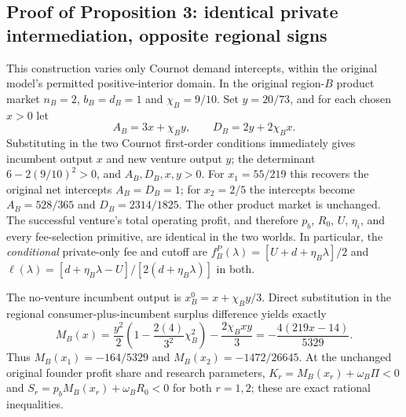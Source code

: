 \subsection{Proof of Proposition 3: identical private intermediation, opposite regional signs}
\label{app:incidence-twins}
This construction varies only Cournot demand intercepts, within the original
model's permitted positive-interior domain. In the original region-$B$
product market $n_B=2$, $b_B=d_B=1$ and $\chi_B=9/10$.
Set $y=20/73$, and for each chosen $x>0$ let
\[
 A_B=3x+\chi_B y,\qquad D_B=2y+2\chi_B x.
\]
Substituting in the two Cournot first-order conditions immediately gives
incumbent output $x$ and new venture output $y$; the determinant
$6-2(9/10)^2>0$, and $A_B,D_B,x,y>0$.
For $x_1=55/219$ this recovers the original net intercepts
$A_B=D_B=1$; for $x_2=2/5$ the intercepts become
$A_B=528/365$ and $D_B=2314/1825$.
The other product market is unchanged. The successful venture's
total operating profit, and therefore $p_b$, $R_0$, $U$, $\eta_i$,
and every fee-selection primitive, are identical in the two worlds.
In particular, the \emph{conditional} private-only fee and cutoff
are $f_B^P(\lambda)=[U+d+\eta_B\lambda]/2$ and
$\ell(\lambda)=[d+\eta_B\lambda-U]/[2(d+\eta_B\lambda)]$
in both.

The no-venture incumbent output is
$x_B^0=x+\chi_B y/3$. Direct substitution in the regional
consumer-plus-incumbent surplus difference yields exactly
\[
 M_B(x)
 =\frac{y^2}{2}
   \left(1-\frac{2(4)}{3^2}\chi_B^2\right)
     -\frac{2\chi_B xy}{3}
 =-\frac{4(219x-14)}{5329}.
\]
Thus
$M_B(x_1)=-164/5329$ and
$M_B(x_2)=-1472/26645$.
At the unchanged original founder profit share and research parameters,
$K_r=M_B(x_r)+\omega_B\Pi<0$ and
$S_r=p_bM_B(x_r)+\omega_BR_0<0$ for both $r=1,2$;
these are exact rational inequalities.

